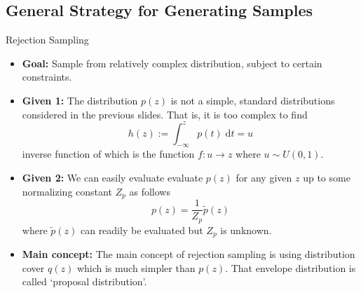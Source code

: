 \documentclass{bredelebeamer}
\begin{document}
\subsection{General Strategy for Generating Samples}
\begin{frame}{Rejection Sampling}
  \begin{itemize}
    \item \textbf{Goal:} Sample from relatively complex distribution, subject
    to certain constraints.

    \item \textbf{Given 1:} The distribution $p(z)$ is not a simple, standard
    distributions considered in the previous slides. That is, it is too complex
    to find
    \begin{equation}
      h(z) := \int_{-\infty}^{z} p(t) \;\mathrm{d}t = u
    \end{equation}
    inverse function of which is the function $f:u \rightarrow z$ where
    $u \sim U(0,1)$.

    \item \textbf{Given 2:} We can easily evaluate evaluate $p(z)$
    for any given $z$ up to some normalizing constant $Z_p$ as follows
    \begin{equation}
      p(z) = \frac{1}{Z_p} \tilde{p}(z)
    \end{equation}
    where $\tilde{p}(z)$ can readily be evaluated but $Z_p$ is unknown.

    \item \textbf{Main concept:} The main concept of rejection sampling is
    using distribution cover $q(z)$ which is much simpler than $p(z)$. That
    envelope distribution is called `proposal distribution'.

  \end{itemize}
\end{frame}
\end{document}
